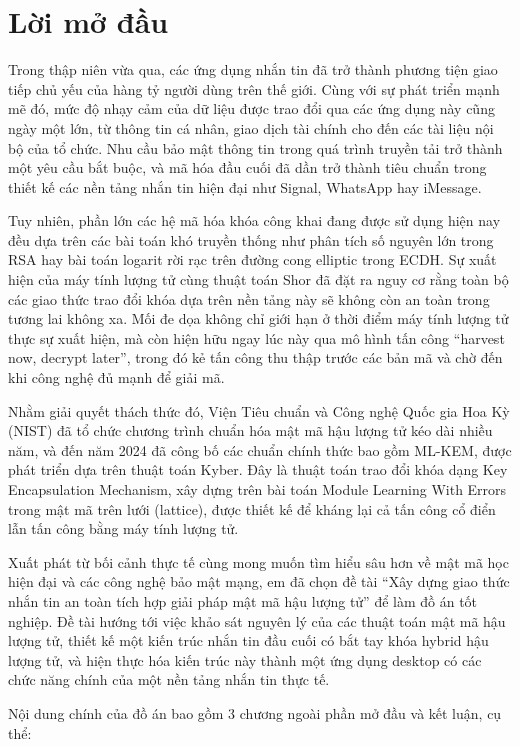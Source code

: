\chapter*{Lời mở đầu}

Trong thập niên vừa qua, các ứng dụng nhắn tin đã trở thành phương tiện giao tiếp chủ yếu của hàng tỷ người dùng trên thế giới. Cùng với sự phát triển mạnh mẽ đó, mức độ nhạy cảm của dữ liệu được trao đổi qua các ứng dụng này cũng ngày một lớn, từ thông tin cá nhân, giao dịch tài chính cho đến các tài liệu nội bộ của tổ chức. Nhu cầu bảo mật thông tin trong quá trình truyền tải trở thành một yêu cầu bắt buộc, và mã hóa đầu cuối đã dần trở thành tiêu chuẩn trong thiết kế các nền tảng nhắn tin hiện đại như Signal, WhatsApp hay iMessage.

Tuy nhiên, phần lớn các hệ mã hóa khóa công khai đang được sử dụng hiện nay đều dựa trên các bài toán khó truyền thống như phân tích số nguyên lớn trong RSA hay bài toán logarit rời rạc trên đường cong elliptic trong ECDH. Sự xuất hiện của máy tính lượng tử cùng thuật toán Shor đã đặt ra nguy cơ rằng toàn bộ các giao thức trao đổi khóa dựa trên nền tảng này sẽ không còn an toàn trong tương lai không xa. Mối đe dọa không chỉ giới hạn ở thời điểm máy tính lượng tử thực sự xuất hiện, mà còn hiện hữu ngay lúc này qua mô hình tấn công “harvest now, decrypt later”, trong đó kẻ tấn công thu thập trước các bản mã và chờ đến khi công nghệ đủ mạnh để giải mã.

Nhằm giải quyết thách thức đó, Viện Tiêu chuẩn và Công nghệ Quốc gia Hoa Kỳ (NIST) đã tổ chức chương trình chuẩn hóa mật mã hậu lượng tử kéo dài nhiều năm, và đến năm 2024 đã công bố các chuẩn chính thức bao gồm ML-KEM, được phát triển dựa trên thuật toán Kyber. Đây là thuật toán trao đổi khóa dạng Key Encapsulation Mechanism, xây dựng trên bài toán Module Learning With Errors trong mật mã trên lưới (lattice), được thiết kế để kháng lại cả tấn công cổ điển lẫn tấn công bằng máy tính lượng tử.

Xuất phát từ bối cảnh thực tế cùng mong muốn tìm hiểu sâu hơn về mật mã học hiện đại và các công nghệ bảo mật mạng, em đã chọn đề tài “Xây dựng giao thức nhắn tin an toàn tích hợp giải pháp mật mã hậu lượng tử” để làm đồ án tốt nghiệp. Đề tài hướng tới việc khảo sát nguyên lý của các thuật toán mật mã hậu lượng tử, thiết kế một kiến trúc nhắn tin đầu cuối có bắt tay khóa hybrid hậu lượng tử, và hiện thực hóa kiến trúc này thành một ứng dụng desktop có các chức năng chính của một nền tảng nhắn tin thực tế.

Nội dung chính của đồ án bao gồm 3 chương ngoài phần mở đầu và kết luận, cụ thể:

